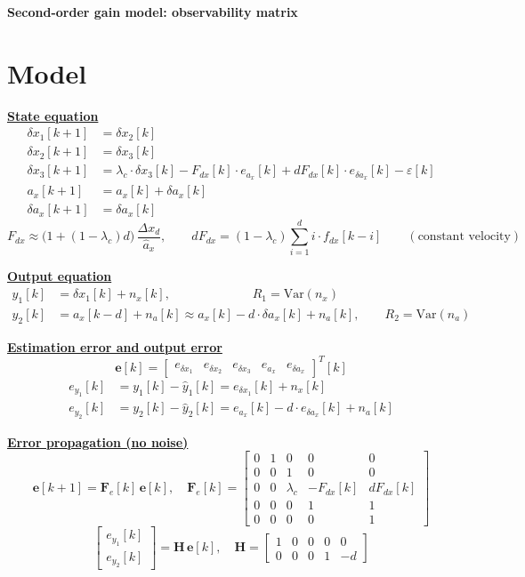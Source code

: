 \documentclass[11pt,a4paper]{ctexart}
\newcommand{\lc}{\lambda_c}
\newcommand{\hd}[1]{\par\bigskip\noindent\underline{\textbf{#1}}}
\begin{document}
\begin{center}\textbf{\large Second-order gain model: observability matrix}\end{center}

\section{Model}

\hd{State equation}
\[
\begin{aligned}
\delta x_1[k+1] &= \delta x_2[k] \\
\delta x_2[k+1] &= \delta x_3[k] \\
\delta x_3[k+1] &= \lc \cdot \delta x_3[k] - F_{dx}[k]\cdot e_{a_x}[k] + dF_{dx}[k]\cdot e_{\delta a_x}[k] - \varepsilon[k] \\
a_x[k+1] &= a_x[k] + \delta a_x[k] \\
\delta a_x[k+1] &= \delta a_x[k]
\end{aligned}
\]
\[
F_{dx} \approx \big(1 + (1-\lc)d\big)\,\frac{\Delta x_d}{\hat a_x}, \qquad
dF_{dx} = (1-\lc)\textstyle\sum_{i=1}^{d} i\cdot f_{dx}[k-i] \qquad (\text{constant velocity})
\]

\hd{Output equation}
\[
\begin{aligned}
y_1[k] &= \delta x_1[k] + n_x[k], \qquad\qquad\qquad\;\; R_1 = \mathrm{Var}(n_x) \\
y_2[k] &= a_x[k-d] + n_a[k] \approx a_x[k] - d\cdot\delta a_x[k] + n_a[k], \qquad R_2 = \mathrm{Var}(n_a)
\end{aligned}
\]

\hd{Estimation error and output error}
\[
\mathbf{e}[k] = \begin{bmatrix} e_{\delta x_1} & e_{\delta x_2} & e_{\delta x_3} & e_{a_x} & e_{\delta a_x} \end{bmatrix}^T[k]
\]
\[
\begin{aligned}
e_{y_1}[k] &= y_1[k] - \hat y_1[k] = e_{\delta x_1}[k] + n_x[k] \\
e_{y_2}[k] &= y_2[k] - \hat y_2[k] = e_{a_x}[k] - d\cdot e_{\delta a_x}[k] + n_a[k]
\end{aligned}
\]

\hd{Error propagation (no noise)}
\[
\mathbf{e}[k+1] = \mathbf{F}_e[k]\,\mathbf{e}[k], \quad
\mathbf{F}_e[k] =
\begin{bmatrix}
0 & 1 & 0 & 0 & 0 \\
0 & 0 & 1 & 0 & 0 \\
0 & 0 & \lc & -F_{dx}[k] & dF_{dx}[k] \\
0 & 0 & 0 & 1 & 1 \\
0 & 0 & 0 & 0 & 1
\end{bmatrix}
\]
\[
\begin{bmatrix} e_{y_1}[k] \\ e_{y_2}[k] \end{bmatrix} = \mathbf{H}\,\mathbf{e}[k], \quad
\mathbf{H} =
\begin{bmatrix}
1 & 0 & 0 & 0 & 0 \\
0 & 0 & 0 & 1 & -d
\end{bmatrix}
\]
\end{document}
